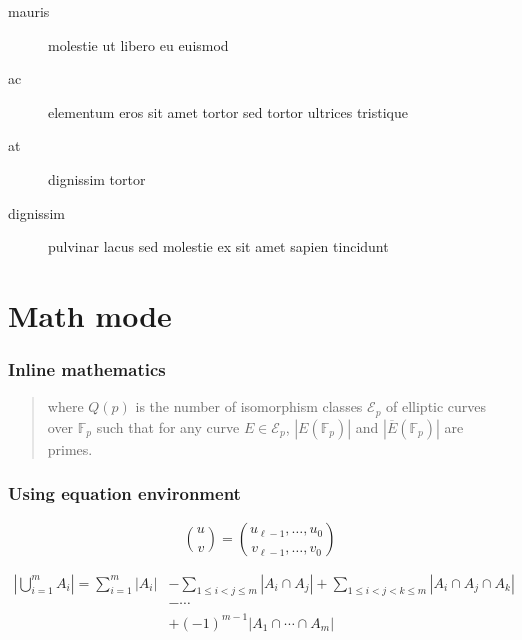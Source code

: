 \documentclass[a4paper,10pt]{article}
\begin{document}
\begin{description}
  \item[mauris] molestie ut libero eu euismod
  \item[ac] elementum eros sit amet tortor sed tortor ultrices tristique
  \item[at] dignissim tortor
  \item[dignissim] pulvinar lacus sed molestie ex sit amet sapien tincidunt
\end{description}


\pagebreak


\section*{Math mode}
\subsubsection*{Inline mathematics}

\begin{quote}
where $Q(p)$ is the number of isomorphism classes ${\mathcal E}_p$ of elliptic curves over ${\mathbb F}_p$
such that for any curve $E \in {\mathcal E}_p$,
$|E({\mathbb F}_p)|$ and  $|\overline{E}({\mathbb F}_p)|$
are primes.
\end{quote}

\subsubsection*{Using equation environment}

\begin{equation}
  \label{math:a}
  \binom{u}{v} = \binom{u_{\ell-1},\dots,u_0}{v_{\ell-1},\dots,v_0}
\end{equation}

\begin{equation}
  \label{math:b}
  \begin{aligned}
    \left| \bigcup_{i=1}^m A_i \right| = \sum_{i=1}^{m} \left| A_i \right|
      &- \sum_{1\le i < j \le m} \left| A_i \cap A_j\right|
      + \sum_{1 \le i < j < k \le m} \left| A_i \cap A_j \cap A_k \right| \\
      &- \cdots 		\\
      &+ (-1)^{m-1}\left| A_1 \cap \cdots \cap A_m \right|
  \end{aligned}
\end{equation}
\end{document}
